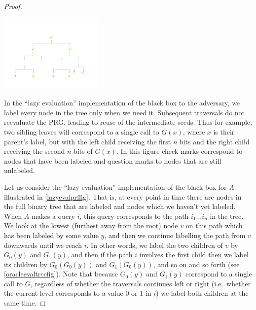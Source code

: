 \begin{proof}
\begin{marginfigure}
\centering
\includegraphics[width=\linewidth, height=1.5in, keepaspectratio]{../figure/Lazy_PRF_from_PRG.jpg}
\caption{In the ``lazy evaluation'' implementation of the black box to
the adversary, we label every node in the tree only when we need it.
Subsequent traversals do not reevaluate the PRG, leading to reuse of the
intermediate seeds. Thus for example, two sibling leaves will correspond
to a single call to \(G(x)\), where \(x\) is their parent's label, but
with the left child receiving the first \(n\) bits and the right child
receiving the second \(n\) bits of \(G(x)\). In this figure check marks
correspond to nodes that have been labeled and question marks to nodes
that are still unlabeled.}
\label{lazyevalprffig}
\end{marginfigure}

Let us consider the ``lazy evaluation'' implementation of the black box
for \(A\) illustrated in \cref{lazyevalprffig}. That is, at every point
in time there are nodes in the full binary tree that are labeled and
nodes which we haven't yet labeled. When \(A\) makes a query \(i\), this
query corresponds to the path \(i_1\ldots i_n\) in the tree. We look at
the lowest (furthest away from the root) node \(v\) on this path which
has been labeled by some value \(y\), and then we continue labelling the
path from \(v\) downwards until we reach \(i\). In other words, we label
the two children of \(v\) by \(G_0(y)\) and \(G_1(y)\), and then if the
path \(i\) involves the first child then we label its children by
\(G_0(G_0(y))\) and \(G_1(G_0(y))\), and so on and so forth (see
\cref{oracleevaltreefig}). Note that because \(G_{0}(y)\) and
\(G_{1}(y)\) correspond to a single call to \(G\), regardless of whether
the traversals continues left or right (i.e.~whether the current level
corresponds to a value 0 or 1 in \(i\)) we label both children at the
same time.


\end{proof}
